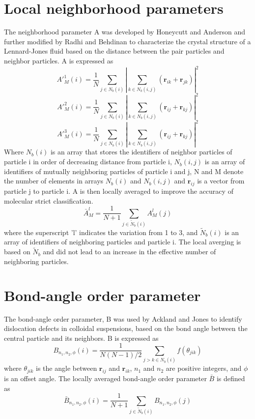 \section{Local neighborhood parameters}
The neighborhood parameter A was developed by Honeycutt and Anderson\cite{Honeycutt1987}\cite{Maras2016} and further modified by Radhi and Behdinan\cite{Radhi2017} to characterize the crystal structure of a Lennard-Jones fluid based on the distance between the pair particles and neighbor particles. A  is expressed as 
\[ A'^1_M(i) = \frac{1}{N} \sum_{j\in N_b(i)} |\sum_{k \in N_b(i,j)} (\textbf{r}_{ik} + \textbf{r}_{jk})|^2 \]
\[ A'^2_M(i) = \frac{1}{N} \sum_{j\in N_b(i)} |\sum_{k \in N_b(i,j)} (\textbf{r}_{ij} + \textbf{r}_{kj})|^2 \]
\[ A'^3_M(i) = \frac{1}{N} \sum_{j\in N_b(i)} |\sum_{k \in N_b(i,j)} (\textbf{r}_{ij} + \textbf{r}_{kj})|^2 \]
Where $N_b(i)$ is an array that stores the identifiers of neighbor particles of particle i in order of decreasing distance from particle i, $N_b(i,j)$ is an array of identifiers of mutually neighboring particles of particle i and j, N and M denote the number of elements in arrays $N_b(i)$ and $N_b(i,j)$ and $\textbf{r}_{ij}$ is a vector from particle j to particle i. A is then locally averaged to improve the accuracy of molecular strict classification.
\[ \bar {A}_M ^l = \frac{1}{N+1} \sum_{j \in \tilde{N}_b(i)} A_M^l(j)\]
where the superscript 'l' indicates the variation from 1 to 3, and $\tilde{N}_b(i)$ is an array of identifiers of neighboring particles and particle i. The local averging is based on $\tilde{N}_b$ and did not lead to an increase in the effective number of neighboring particles. 
\section{Bond-angle order parameter}
The bond-angle order parameter, B was used by Ackland and Jones\cite{Ackland2006} to identify dislocation defects in colloidal suspensions, based on the bond angle between the central particle and its neighbors. B is expressed as 
\[B_{n_1, n_2, \phi}(i)  = \frac {1}{N(N-1)/2} \sum_{j > k \in N_b(i)} f(\theta_{jik})\]
where $\theta_{jik}$ is the angle between $\textbf{r}_{ij}$ and $\textbf{r}_{ik}$, $n_1$ and $n_2$ are positive integers, and $\phi$ is an offset angle. The locally averaged bond-angle order parameter $\bar{B}$ is defined as
\[ \bar{B}_{n_1, n_2, \phi}(i) = \frac{1}{N+1}\sum_{j \in \tilde{N}_b(i)} B_{n_1, n_2, \phi}(j)\]
